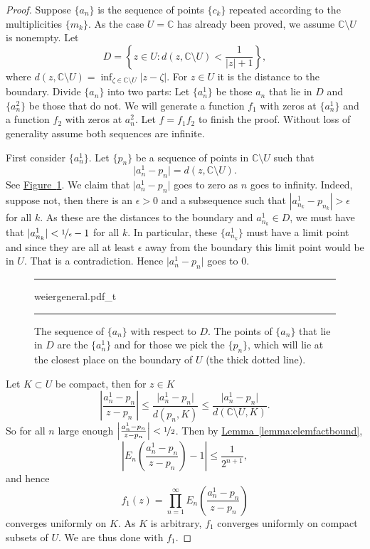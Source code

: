 \documentclass[12pt,openany]{book}
\newcommand{\sabs}[1]{\lvert {#1} \rvert}
\newcommand{\abs}[1]{\left\lvert {#1} \right\rvert}
\newcommand{\C}{{\mathbb{C}}}
\theoremstyle{plain}
\theoremstyle{remark}
\theoremstyle{definition}
\newenvironment{myfig}{%
\begin{figure}[h!t]
\noindent\rule{\textwidth}{0.5pt}\vspace{12pt}\par\centering}%
{\par\noindent\rule{\textwidth}{0.5pt}
\end{figure}}
\theoremstyle{exercise}
\theoremstyle{example}
\newcommand{\figureref}[1]{\hyperref[#1]{Figure~\ref*{#1}}}
\newcommand{\lemmaref}[1]{\hyperref[#1]{Lemma~\ref*{#1}}}
\begin{document}
\begin{proof}
Suppose $\{ a_n \}$ is the sequence of points $\{ c_k \}$ repeated
according to the multiplicities $\{ m_k \}$.
As the case $U=\C$ has already been proved, we assume $\C \setminus
U$ is nonempty.
Let
\begin{equation*}
D = \left\{ z \in U :
d(z,\C \setminus U) < \frac{1}{\sabs{z}+1}
\right\} ,
\end{equation*}
where $d(z,\C\setminus U) = \inf_{\zeta \in \C \setminus U}
\sabs{z-\zeta}$.  For $z \in U$ it is the distance to the boundary.
Divide $\{ a_n \}$ into two parts:
Let $\{ a^1_n \}$ be those $a_n$ that lie in $D$ and $\{ a^2_n \}$
be those that do not.
We will generate a function $f_1$ with zeros at $\{ a^1_n \}$ and
a function $f_2$ with zeros at $a^2_n$.  Let $f = f_1 f_2$
to finish the proof.
Without loss of generality assume both sequences are infinite.

First consider $\{ a^1_n \}$.  Let $\{ p_n \}$ be a sequence of points in
$\C \setminus U$ such
that
\begin{equation*}
\sabs{a^1_n-p_n} = d(z,\C \setminus U).
\end{equation*}
See \figureref{fig:weiergeneral}.
We claim that 
$\sabs{a^1_n-p_n}$ goes to zero as $n$ goes to infinity.
Indeed, suppose not, then there is an $\epsilon > 0$ and
a subsequence such that 
$\abs{a^1_{n_k}-p_{n_k}} > \epsilon$ for all $k$.  As these are the
distances to the boundary and $a^1_{n_k} \in D$,
we must have that $\sabs{a^1_{n_k}} < \nicefrac{1}{\epsilon}-1$ for all $k$.
In particular, these $\{ a^1_{n_k} \}$ must have a limit point and since they
are all at least $\epsilon$ away from the boundary this limit point would be
in $U$.  That is a contradiction.  Hence
$\sabs{a^1_n-p_n}$ goes to $0$.

\begin{myfig}
{weiergeneral.pdf_t}
\caption{The sequence of $\{ a_n \}$ with respect to $D$.  The 
points of $\{ a_n \}$ that lie in $D$ are the $\{ a^1_n \}$ and for those we
pick the $\{ p_n \}$, which will lie at the closest place on the boundary of
$U$ (the thick dotted line).\label{fig:weiergeneral}}
\end{myfig}

Let $K \subset U$ be compact, then for $z \in K$
\begin{equation*}
\abs{\frac{a^1_n-p_n}{z-p_n}}
\leq
\frac{\sabs{a^1_n-p_n}}{d(p_n,K)}
\leq
\frac{\sabs{a^1_n-p_n}}{d(\C \setminus U,K)} .
\end{equation*}
So for all $n$ large enough
$\abs{\frac{a^1_n-p_n}{z-p_n}} < \nicefrac{1}{2}$.
Then by \lemmaref{lemma:elemfactbound},
\begin{equation*}
\abs{E_n\left(
\frac{a^1_n-p_n}{z-p_n}
\right)-1} \leq \frac{1}{2^{n+1}} ,
\end{equation*}
and hence
\begin{equation*}
f_1(z)
=
\prod_{n=1}^\infty
E_n\left(
\frac{a^1_n-p_n}{z-p_n}
\right)
\end{equation*}
converges uniformly on $K$.  As $K$ is arbitrary, $f_1$ converges
uniformly on compact subsets of $U$.  We are thus done with $f_1$.


\end{proof}
\end{document}
